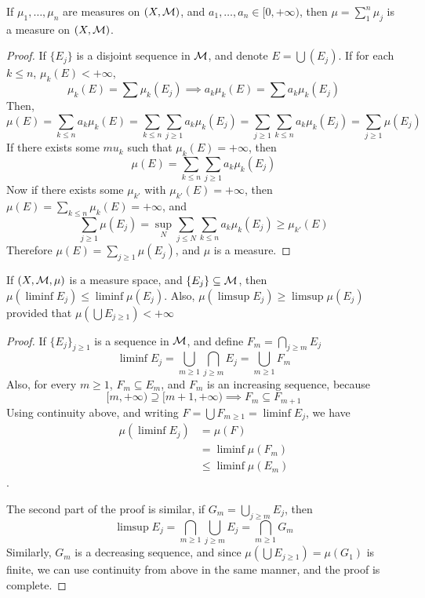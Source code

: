 \documentclass[../../main.tex]{subfiles}
\begin{document}
\begin{wts}
    If $\mu_1,\ldots,\mu_n$ are measures on $(X,\mathcal{M})$, and $a_1,\ldots, a_n\in[0,+\infty)$, then $\mu = \sum^n_1\mu_j$ is a measure on $(X,\mathcal{M})$.
\end{wts}
\begin{proof}
    If $\{E_j\}$ is a disjoint sequence in $\mathcal{M}$, and denote $E = \bigcup (E_j)$. If for each $k\leq n$, $\mu_k(E)<+\infty$, 
    \[
    \mu_k(E)=\sum \mu_k(E_j)\implies a_k\mu_k(E)=\sum a_k\mu_k(E_j)
    \]
    Then,
    \[
    \mu(E)=\sum_{k\leq n}a_k\mu_k(E)= \sum_{k\leq n}\sum_{j\geq 1}a_k\mu_k(E_j)=\sum_{j\geq 1}\sum_{k\leq n}a_k\mu_k(E_j)=\sum_{j\geq 1}\mu(E_j)
    \]
    If there exists some $mu_k$ such that $\mu_k(E) = +\infty$, then 
    \[
    \mu(E) = \sum_{k\leq n}\sum_{j\geq 1}a_k\mu_k(E_j)
    \]
    Now if there exists some $\mu_{k'}$ with $\mu_{k'}(E)=+\infty$, then $\mu(E)=\sum_{k\leq n}\mu_k(E)=+\infty$, and 
    \[
    \sum_{j\geq 1}\mu(E_j)=\sup_N\sum_{j\leq N} \sum_{k\leq n}a_k\mu_k(E_j)\geq \mu_{k'}(E)
    \]
    Therefore $\mu(E)=\sum_{j\geq 1}\mu(E_j)$, and $\mu$ is a measure.
\end{proof}
\newpage

\begin{wts}
    If $(X,\mathcal{M},\mu)$ is a measure space, and $\{E_j\}\subseteq \mathcal{M}$, then $\mu(\liminf E_j)\leq \liminf \mu(E_j)$. Also, $\mu(\limsup E_j)\geq \limsup \mu(E_j)$ provided that $\mu(\bigcup E_{j\geq 1})<+\infty$
\end{wts}
\begin{proof}
If $\{E_j\}_{j\geq 1}$ is a sequence in $\mathcal{M}$, and define $F_m = \bigcap_{j\geq m}E_j$
\[
\liminf E_j = \bigcup_{m\geq 1}\bigcap_{j\geq m}E_j = \bigcup_{m\geq 1} F_m
\]
Also, for every $m\geq 1$, $F_m\subseteq E_m$, and $F_m$ is an increasing sequence, because
\[
[m,+\infty)\supseteq [m+1,+\infty)\implies F_m\subseteq F_{m+1}
\]
Using continuity above, and writing $F = \bigcup F_{m\geq 1}=\liminf E_j$, we have
\begin{align*}
    \mu(\liminf E_j) &= \mu(F)\\
    &= \liminf \mu(F_m)\\
    &\leq \liminf \mu(E_m)
\end{align*}.

The second part of the proof is similar, if $G_m = \bigcup_{j\geq m} E_j$, then
\[
\limsup E_j = \bigcap_{m\geq 1}\bigcup_{j\geq m} E_j = \bigcap_{m\geq 1}G_m
\]
Similarly, $G_m$ is a decreasing sequence, and since $\mu(\bigcup E_{j\geq 1}) = \mu(G_1)$ is finite, we can use continuity from above in the same manner, and the proof is complete.
\end{proof}
\newpage
\end{document}
